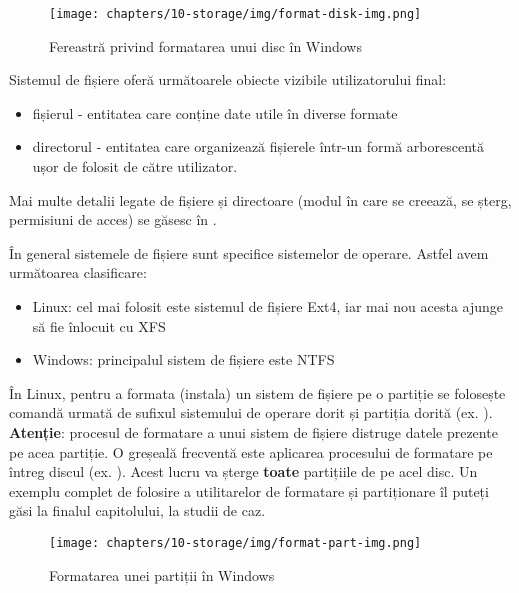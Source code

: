 \begin{figure}[!htbp]
	\centering
	\texttt{[image: chapters/10-storage/img/format-disk-img.png]}
	\caption{Fereastră privind formatarea unui disc în Windows}
	\label{fig:storage:format-disk}
\end{figure}

Sistemul de fișiere oferă următoarele obiecte vizibile utilizatorului final:

\begin{itemize}
	\item fișierul - entitatea care conține date utile în diverse formate
	\item directorul - entitatea care organizează fișierele într-un formă
		arborescentă ușor de folosit de către utilizator.
\end{itemize}

Mai multe detalii legate de fișiere și directoare (modul în care se creează, se
șterg, permisiuni de acces) se găsesc în
.

În general sistemele de fișiere sunt specifice sistemelor de operare. Astfel avem următoarea clasificare:

\begin{itemize}
	\item Linux: cel mai folosit este sistemul de fișiere Ext4, iar mai nou
		acesta ajunge să fie înlocuit cu XFS
	\item Windows: principalul sistem de fișiere este NTFS
\end{itemize}

În Linux, pentru a formata (instala) un sistem de fișiere pe o partiție se
folosește comandă  urmată de sufixul sistemului de operare dorit și
partiția dorită (ex. ). \textbf{Atenție}: procesul de
formatare a unui sistem de fișiere distruge datele prezente pe acea partiție. O
greșeală frecventă este aplicarea procesului de formatare pe întreg discul (ex.
). Acest lucru va șterge \textbf{toate} partițiile de pe
acel disc. Un exemplu complet de folosire a utilitarelor de formatare și
partiționare îl puteți găsi la finalul capitolului, la studii de caz.

\begin{figure}[!htbp]
	\centering
	\texttt{[image: chapters/10-storage/img/format-part-img.png]}
	\caption{Formatarea unei partiții în Windows}
        \label{fig:storage:win-format}
\end{figure}

